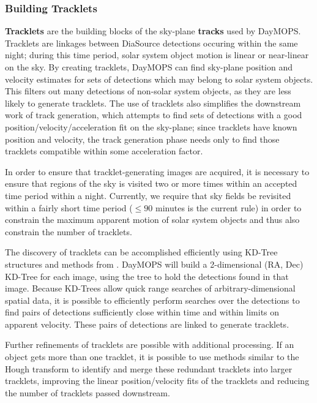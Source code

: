 \documentclass[12pt,preprint]{aastex}
\begin{document}
\subsubsection{Building Tracklets}


\textbf{Tracklets} are the building blocks of the sky-plane
\textbf{tracks} used by DayMOPS.  Tracklets are linkages between
DiaSource detections occuring within the same night; during this time
period, solar system object motion is linear or near-linear on the
sky. By creating tracklets, DayMOPS can find sky-plane position and
velocity estimates for sets of detections which may belong to solar
system objects.  This filters out many detections of non-solar system
objects, as they are less likely to generate tracklets.  The use of
tracklets also simplifies the downstream work of track generation,
which attempts to find sets of detections with a good
position/velocity/acceleration fit on the sky-plane; since tracklets
have known position and velocity, the track generation phase needs
only to find those tracklets compatible within some acceleration
factor.

In order to ensure that tracklet-generating images are acquired, it is
necessary to ensure that regions of the sky is visited two or more
times within an accepted time period within a night.  Currently, we
require that sky fields be revisited within a fairly short time period
($\leq 90$ minutes is the current rule) in order to constrain the
maximum apparent motion of solar system objects and thus also
constrain the number of tracklets.

The discovery of tracklets can be accomplished efficiently using
KD-Tree structures \citep{bentley_kdtrees} and methods from
\citet{kubica_thesis}.  DayMOPS will build a 2-dimensional (RA, Dec)
KD-Tree for each image, using the tree to hold the detections found in
that image.  Because KD-Trees allow quick range searches of
arbitrary-dimensional spatial data, it is possible to efficiently
perform searches over the detections to find pairs of detections
sufficiently close within time and within limits on apparent
velocity. These pairs of detections are linked to generate tracklets.


Further refinements of tracklets are possible with additional
processing. If an object gets more than one tracklet, it is possible
to use methods similar to the Hough transform to identify and merge
these redundant tracklets into larger tracklets, improving the linear
position/velocity fits of the tracklets and reducing the number of
tracklets passed downstream.
\end{document}
